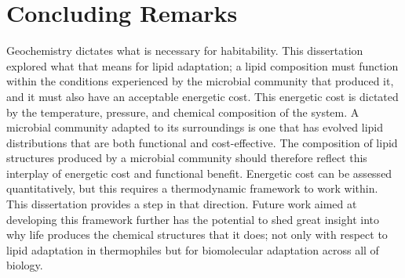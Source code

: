 \section{Concluding Remarks}
Geochemistry dictates what is necessary for habitability. This dissertation explored what that means for lipid adaptation; a lipid composition must function within the conditions experienced by the microbial community that produced it, and it must also have an acceptable energetic cost. This energetic cost is dictated by the temperature, pressure, and chemical composition of the system. A microbial community adapted to its surroundings is one that has evolved lipid distributions that are both functional and cost-effective. The composition of lipid structures produced by a microbial community should therefore reflect this interplay of energetic cost and functional benefit. Energetic cost can be assessed quantitatively, but this requires a thermodynamic framework to work within. This dissertation provides a step in that direction. Future work aimed at developing this framework further has the potential to shed great insight into why life produces the chemical structures that it does; not only with respect to lipid adaptation in thermophiles but for biomolecular adaptation across all of biology.





